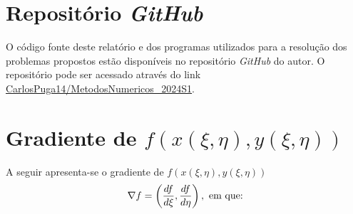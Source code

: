 \section{Reposit\'orio \textit{GitHub}}\label{sec:github}
O c\'odigo fonte deste relat\'orio e dos programas utilizados para a resolu\c{c}\~ao dos problemas propostos est\~ao dispon\'iveis no reposit\'orio \textit{GitHub} do autor. O reposit\'orio pode ser acessado atrav\'es do link \href{https://github.com/CarlosPuga14/MetodosNumericos_2024S1}{CarlosPuga14/MetodosNumericos\_2024S1}.

\section{Gradiente de $f(x(\xi, \eta), y(\xi, \eta))$}\label{sec:gradienteF}
A seguir apresenta-se o gradiente de $f(x(\xi, \eta), y(\xi, \eta))$
\begin{equation*}
    \nabla f = \left(\frac{df}{d\xi}, \frac{df}{d\eta} \right), \text{~em que:}
\end{equation*} 

\newpage
{}
\pagestyle{headings}

